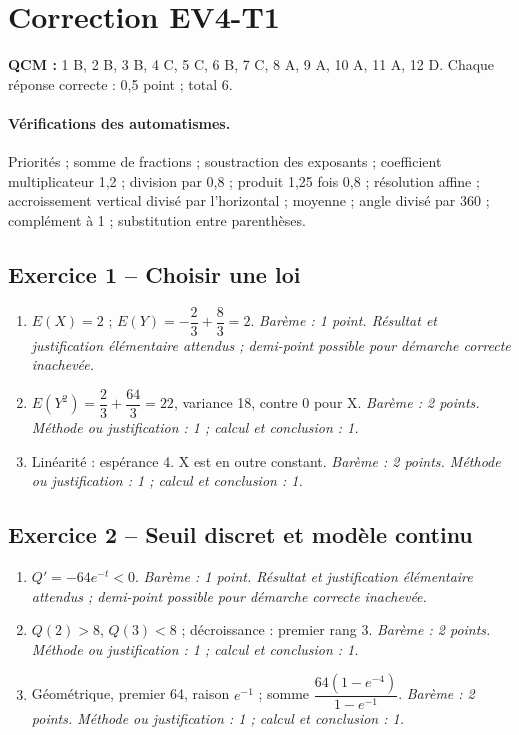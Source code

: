 \mxnewpage\section*{Correction EV4-T1}\label{EV4-T1-CORR}
\textbf{QCM :} 1 B, 2 B, 3 B, 4 C, 5 C, 6 B, 7 C, 8 A, 9 A, 10 A, 11 A, 12 D. Chaque réponse correcte : 0{,}5 point ; total 6.
\paragraph{Vérifications des automatismes.} Priorités ; somme de fractions ; soustraction des exposants ; coefficient multiplicateur 1{,}2 ; division par 0{,}8 ; produit 1{,}25 fois 0{,}8 ; résolution affine ; accroissement vertical divisé par l’horizontal ; moyenne ; angle divisé par 360 ; complément à 1 ; substitution entre parenthèses.
\subsection*{Exercice 1 -- Choisir une loi}
\begin{enumerate}
\item $E(X)=2$ ; $E(Y)=-\dfrac{2}{3}+\dfrac{8}{3}=2$. \textit{Barème : 1 point. Résultat et justification élémentaire attendus ; demi-point possible pour démarche correcte inachevée.}
\item $E(Y^2)=\dfrac{2}{3}+\dfrac{64}{3}=22$, variance 18, contre 0 pour X. \textit{Barème : 2 points. Méthode ou justification : 1 ; calcul et conclusion : 1.}
\item Linéarité : espérance 4. X est en outre constant. \textit{Barème : 2 points. Méthode ou justification : 1 ; calcul et conclusion : 1.}
\end{enumerate}
\subsection*{Exercice 2 -- Seuil discret et modèle continu}
\begin{enumerate}
\item $Q\prime=-64e^{-t}<0$. \textit{Barème : 1 point. Résultat et justification élémentaire attendus ; demi-point possible pour démarche correcte inachevée.}
\item $Q(2)>8$, $Q(3)<8$ ; décroissance : premier rang 3. \textit{Barème : 2 points. Méthode ou justification : 1 ; calcul et conclusion : 1.}
\item Géométrique, premier 64, raison $e^{-1}$ ; somme $\dfrac{64(1-e^{-4})}{1-e^{-1}}$. \textit{Barème : 2 points. Méthode ou justification : 1 ; calcul et conclusion : 1.}
\end{enumerate}
